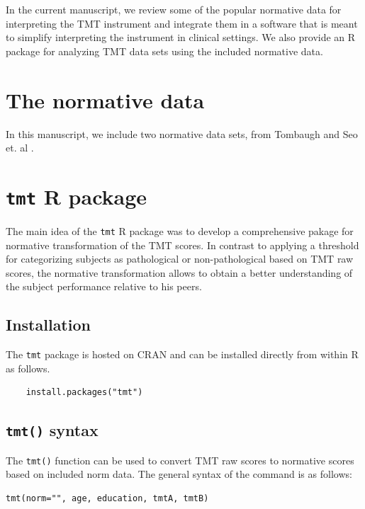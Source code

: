 \documentclass[]{article}
\begin{document}
    In the current manuscript, we review some of the popular normative data for interpreting the TMT instrument and integrate them in a software that is meant to simplify interpreting the instrument in clinical settings. We also provide an R package for analyzing TMT data sets using the included normative data.   
	

\section{The normative data}
	
	In this manuscript, we include two normative data sets, from Tombaugh \citeyear{tombaugh2004trail} and Seo et. al \citeyear{seo2006}. 
	
	
	
	
	
\section{\texttt{tmt} R package}

The main idea of the \texttt{tmt} R package was to develop a comprehensive pakage for normative transformation of the TMT scores. In contrast to applying a threshold for categorizing subjects as pathological or non-pathological based on TMT raw scores, the normative transformation allows to obtain a better understanding of the subject performance relative to his peers. 


\subsection{Installation}

The \texttt{tmt} package is hosted on CRAN and can be installed directly from within R as follows.

\begin{verbatim}
    install.packages("tmt")
\end{verbatim}

\subsection{\texttt{tmt()} syntax}

The \texttt{tmt()} function can be used to convert TMT raw scores to normative scores based on included norm data. The general syntax of the command is as follows:

\begin{verbatim}
tmt(norm="", age, education, tmtA, tmtB)
\end{verbatim}
\end{document}
